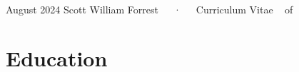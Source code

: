 \documentclass[11pt,a4paper,]{awesome-cv}
\begin{document}
\makecvheader

\makecvfooter
  {August 2024}
    {Scott William Forrest~~~·~~~Curriculum Vitae}
  {\thepage~ of \pageref{LastPage}~}





\section{Education}\label{education}
\end{document}
